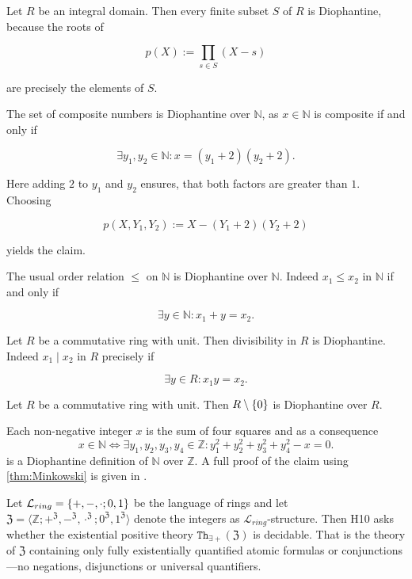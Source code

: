\begin{exam}
  \begin{exlist}
    \item Let $R$ be an integral domain.
    Then every finite subset $S$ of $R$ is Diophantine, because the roots of

    \[ p(X) := \prod_{s ∈ S} (X - s) \]

    are precisely the elements of $S$.

    \item The set of composite numbers is Diophantine over $ℕ$, as $x ∈ ℕ$ is composite if and only if

    \[ ∃ y_1, y_2 ∈ ℕ : x = (y_1 + 2) (y_2 + 2). \]

    Here adding $2$ to $y_1$ and $y_2$ ensures, that both factors are greater than $1$.
    Choosing

    \[ p (X, Y_1, Y_2) := X - (Y_1 + 2)(Y_2 + 2) \]

    yields the claim.

    \item The usual order relation $≤$ on $ℕ$ is Diophantine over $ℕ$.
    Indeed $x_1 ≤ x_2$ in $ℕ$ if and only if

    \[ ∃ y ∈ ℕ : x_1 + y  = x_2. \]

    \item Let $R$ be a commutative ring with unit.
    Then divisibility in $R$ is Diophantine.
    Indeed $x_1 \mid x_2$ in $R$ precisely if

    \[ ∃ y ∈ R : x_1 y = x_2. \]

    \item Let $R$ be a commutative ring with unit. Then $R \setminus \left\lbrace 0 \right\rbrace$ is
    Diophantine over $R$.
    \item \label{ex:N is Diophantine over Z}
    Each non-negative integer $x$ is the sum of four squares and as a consequence
    \[
      x ∈ ℕ ⇔ ∃y_1,y_2,y_3,y_4∈ℤ: y_1^2 + y_2^2 + y_3^2 + y_4^2 - x = 0.
    \]
    is a Diophantine definition of $ℕ$ over $ℤ$. A full proof of the claim using \cref{thm:Minkowski} is given in \cite[Remark 4.20]{Milne2017}.
  \end{exlist}
\end{exam}

Let $\mathcal{L}_{ring} = \left\lbrace +,-,\cdot; 0, 1 \right\rbrace$ be the language of rings and
let $\mathfrak{Z} = ⟨ℤ; +^\mathfrak{Z}, -^\mathfrak{Z}, \cdot^\mathfrak{Z};
0^\mathfrak{Z}, 1^\mathfrak{Z}⟩$ denote the integers as
$\mathcal{L}_{ring}$-structure. Then \textsc{H10} asks whether the existential
positive theory $\mathtt{Th}_{∃+}(\mathfrak{Z})$ is decidable. That is the
theory of $\mathfrak{Z}$ containing only fully existentially quantified atomic
formulas or conjunctions---no negations, disjunctions or universal quantifiers.

